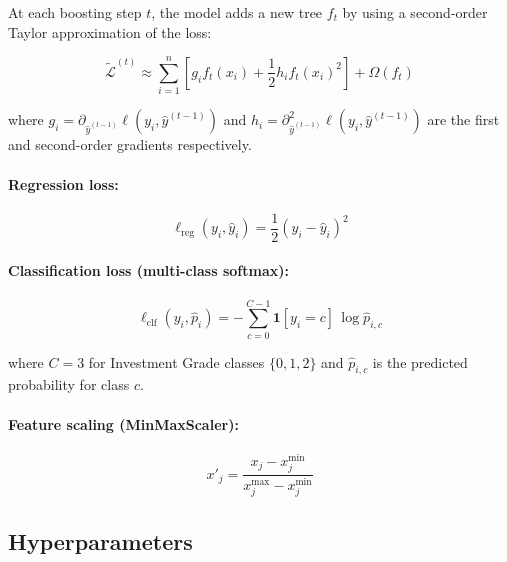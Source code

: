 \documentclass[12pt,a4paper]{article}
\begin{document}
At each boosting step $t$, the model adds a new tree $f_t$ by using a
second-order Taylor approximation of the loss:

\begin{equation}
    \tilde{\mathcal{L}}^{(t)} \approx
    \sum_{i=1}^{n} \left[
        g_i f_t(x_i) + \frac{1}{2} h_i f_t(x_i)^2
    \right] + \Omega(f_t)
    \label{eq:taylor}
\end{equation}

where $g_i = \partial_{\hat{y}^{(t-1)}} \ell(y_i, \hat{y}^{(t-1)})$ and
$h_i = \partial^2_{\hat{y}^{(t-1)}} \ell(y_i, \hat{y}^{(t-1)})$ are the
first and second-order gradients respectively.

\paragraph{Regression loss:}
\begin{equation}
    \ell_{\text{reg}}(y_i, \hat{y}_i) = \frac{1}{2}(y_i - \hat{y}_i)^2
    \label{eq:reg_loss}
\end{equation}

\paragraph{Classification loss (multi-class softmax):}
\begin{equation}
    \ell_{\text{clf}}(y_i, \hat{p}_i) =
    -\sum_{c=0}^{C-1} \mathbf{1}[y_i = c]\,\log\hat{p}_{i,c}
    \label{eq:clf_loss}
\end{equation}

where $C = 3$ for Investment Grade classes $\{0, 1, 2\}$ and
$\hat{p}_{i,c}$ is the predicted probability for class $c$.

\paragraph{Feature scaling (MinMaxScaler):}
\begin{equation}
    x'_j = \frac{x_j - x_j^{\min}}{x_j^{\max} - x_j^{\min}}
    \label{eq:minmax}
\end{equation}

\subsection{Hyperparameters}
\end{document}
